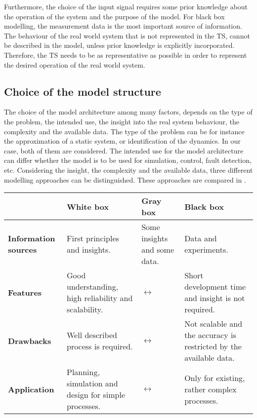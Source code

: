 Furthermore, the choice of the input signal requires some prior knowledge about the operation of the system and the purpose of the model. For black box modelling, the measurement data is the most important source of information. The behaviour of the real world system that is not represented in the TS, cannot be described in the model, unless prior knowledge is explicitly incorporated. Therefore, the TS needs to be as representative as possible in order to represent the desired operation of the real world system. 

\subsection{Choice of the model structure}
\label{choice_of_the_model_architecture}

The choice of the model architecture among many factors, depends on the type of the problem, the intended use, the insight into the real system behaviour, the complexity and the available data. The type of the problem can be for instance the approximation of a static system, or identification of the dynamics. In our case, both of them are considered. The intended use for the model architecture can differ whether the model is to be used for simulation, control, fault detection, etc. Considering the insight, the complexity and the available data, three different modelling approaches can be distinguished\cite{nelles2013nonlinear}. These approaches are compared in . 

\vspace{-3mm}

\begin{center}
    \begin{tabular}{ | >{\centering\arraybackslash}m{1.8cm} | >{\centering\arraybackslash}m{3.6cm} | >{\centering\arraybackslash}m{3.6cm} | >{\centering\arraybackslash}m{3.6cm} |}
    \hline
    \multirow{1}{*}
     & \textbf{White box} & \textbf{Gray box} & \textbf{Black box} \\ 
     \hline
     \multirow{1}{*}
    \textbf{Information sources} & First principles and insights. &  Some insights and some data. & Data and experiments.\\ 
    \hline
      \multirow{1}{*}
    \textbf{Features} & Good understanding, high reliability and scalability. & $\longleftrightarrow$  & Short development time and insight is not required.\\ 
    \hline
      \multirow{1}{*}
    \textbf{Drawbacks} & Well described process is required. & $\longleftrightarrow$ & Not scalable and the accuracy is restricted by the available data.\\ 
    \hline
          \multirow{1}{*}
    \textbf{Application} & Planning, simulation and design for simple processes. & $\longleftrightarrow$ & Only for existing, rather complex processes.\\ 
    \hline
    \end{tabular}
    \label{comparisontable_sysid}
\end{center}

